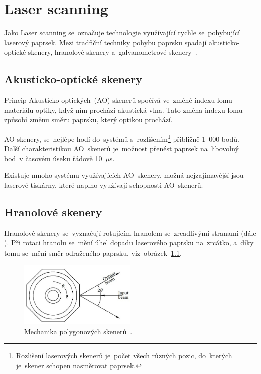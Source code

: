 \chapter{Laser scanning~\cite{scanning-handbook}}

Jako Laser scanning se~označuje technologie využívající rychle se~pohybující laserový paprsek. Mezi tradfiční techniky pohybu paprsku spadají akusticko-optické skenery, hranolové skenery a~galvanometrové skenery~\cite{mems-review}.

\section{Akusticko-optické skenery}
Princip Akusticko-optických~(AO) skenerů spočívá ve~změně indexu lomu materiálu optiky, když ním prochází akustická vlna. Tato změna indexu lomu způsobí změnu směru paprsku, který optikou prochází.

AO skenery, se~nejlépe hodí do~systémů  s~rozlišením\footnote{Rozlišení laserových skenerů je~počet všech různých pozic, do~kterých je~skener schopen nasměrovat paprsek.} přibližně 1~000 bodů.
Další charakteristikou AO~skenerů je~možnost přenést paprsek na~libovolný  bod~v časovém úseku řádově 10~$\mu$s.

Existuje mnoho systému využívajících AO~skenery, možná nejzajímavější jsou laserové tiskárny, které naplno využívají schopnosti AO~skenerů.



\section{Hranolové skenery}
Hranolové skenery se~vyznačují rotujícím hranolem se~zrcadlivými stranami (dále ).
Při rotaci hranolu se~mění úhel dopadu laserového paprsku na~zrcátko, a~díky tomu se~mění směr odraženého paprsku,  viz~obrázek~\ref{fig:polygon-scanner}.

\begin{figure}[H]
  \centering
  \includegraphics[width=0.5\textwidth]{img/polygon-scanner.jpg}
  \caption{\label{fig:polygon-scanner} Mechanika polygonových skenerů~\cite{scanning-handbook}.}
\end{figure}

